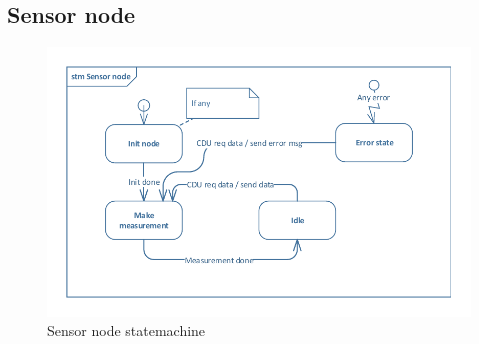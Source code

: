 \subsection{Sensor node}

\begin{figure}[hbpt]
\centering
\includegraphics[width=.8\textwidth]{billeder/sensor_node_STM}
\caption{Sensor node statemachine}
\end{figure}